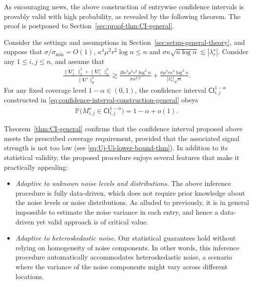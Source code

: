 As encouraging news, the above construction of entrywise confidence intervals is provably valid with high probability, as revealed by the following theorem. The proof is postponed to Section~\ref{sec:proof-thm:CI-general}. 
%
\begin{theorem}
	\label{thm:CI-general}
	Consider the settings and assumptions in Section~\ref{sec:setup-general-theory},  
	and suppose that $\sigma / \sigma_{\min} = O(1)$,  $\kappa^{4}\mu^{2}r^{2}\log n\leq n$ and $\sigma \kappa\sqrt{n\log n}\lesssim |\lambda_{r}^{\star}|$. Consider any $1\leq i,j\leq n$, and assume that
	\begin{align}
		\frac{\big\|\bm{U}_{j,\cdot}^{\star}\big\|_{2}^{2}+\big\|\bm{U}_{i,\cdot}^{\star}\big\|_{2}^{2}}{\big\|\bm{U}^{\star}\big\|_{\mathrm{F}}^{2}}\gtrsim\frac{B\kappa^{2}\mu^{2}r^{2}\log^{2}n}{\sigma n^{3/2}}+\frac{\sigma\mu^{2}r\kappa^{3}\log^{3}n}{|\lambda_{r}^{\star}|\sqrt{n}}.  
		\label{eq:Uj-Ui-lower-bound-thm}
	\end{align}
	For any fixed coverage level $1-\alpha \in (0,1)$, 
	the confidence interval $\mathsf{CI}_{i,j}^{1-\alpha}$ constructed in \eqref{eq:confidence-interval-construction-general} obeys
	\begin{align}
		\mathbb{P} \Big( M_{i,j}^{\star} \in \mathsf{CI}_{i,j}^{1-\alpha}  
		\Big) 
		= 1-\alpha + o(1).
	\end{align}
\end{theorem}
%
Theorem~\ref{thm:CI-general} confirms that the confidence interval proposed above meets the prescribed coverage requirement,
provided that the associated signal strength is not too low (see \eqref{eq:Uj-Ui-lower-bound-thm}). 
In addition to its statistical validity, the proposed procedure enjoys several features that make it practically appealing: 
%
\begin{itemize}
	\item {\em Adaptive to unknown noise levels and distributions.} The above inference procedure is fully data-driven, which does not require prior knowledge about the noise levels or noise distributions. As alluded to previously, it is in general impossible to estimate the noise variance in each entry, and hence a data-driven yet valid approach is of critical value. 

	\item {\em Adaptive to heteroskedastic noise.} Our statistical guarantees hold without relying on homogeneity of noise components. In other words, this inference procedure automatically accommodates heteroskedastic noise, a scenario where the variance of the noise components might vary across different locations.   
\end{itemize}


